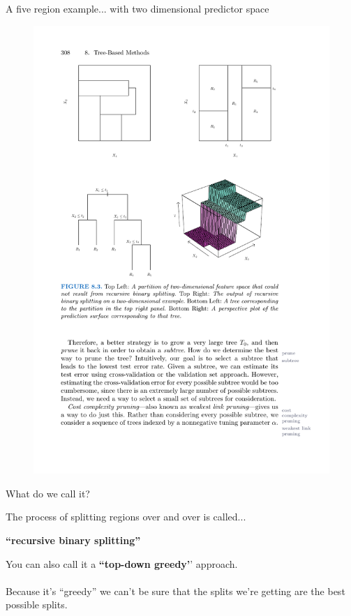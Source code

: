 \documentclass[mathserif, aspectratio=169]{beamer}
\begin{document}
\begin{frame}{A five region example... with two dimensional predictor space}

\begin{figure}
\includegraphics[width=\textwidth]{five_region_ex}
\caption*{}
\end{figure}
\end{frame}

\begin{frame}{What do we call it?}

The process of splitting regions over and over is called...

\begin{center}
\textbf{``recursive binary splitting''}
\end{center}

You can also call it a \textbf{``top-down greedy'}' approach.  \\~\\

Because it's ``greedy'' we can't be sure that the splits we're getting are the best possible splits.  

\end{frame}
\end{document}
